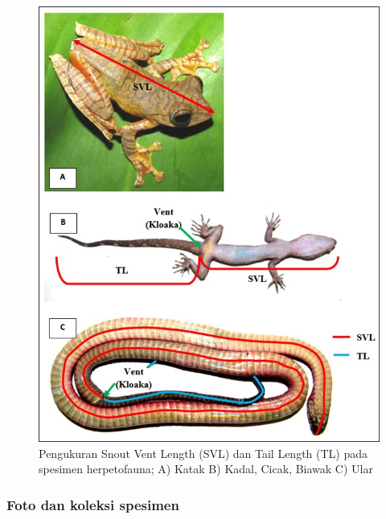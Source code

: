 \documentclass[
  oneside]{book}
\begin{document}
\begin{figure}

{\centering \includegraphics[width=1\linewidth]{images/mhf_ilustration} 

}

\caption{Pengukuran Snout Vent Length (SVL) dan Tail Length (TL) pada spesimen herpetofauna; A) Katak B) Kadal, Cicak, Biawak C) Ular}\label{fig:figmhf}
\end{figure}

\hypertarget{foto-dan-koleksi-spesimen}{%
\subsubsection*{Foto dan koleksi spesimen}\label{foto-dan-koleksi-spesimen}}
\end{document}
